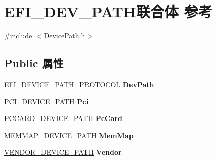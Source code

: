 \hypertarget{union_e_f_i___d_e_v___p_a_t_h}{}\section{E\+F\+I\+\_\+\+D\+E\+V\+\_\+\+P\+A\+T\+H联合体 参考}
\label{union_e_f_i___d_e_v___p_a_t_h}


{\ttfamily \#include $<$Device\+Path.\+h$>$}

\subsection*{Public 属性}
\begin{DoxyCompactItemize}
\item 
\mbox{\label{union_e_f_i___d_e_v___p_a_t_h_ac14a67fbd12394ef0799c15c72fb88a9}} 
\hyperlink{struct_e_f_i___d_e_v_i_c_e___p_a_t_h___p_r_o_t_o_c_o_l}{E\+F\+I\+\_\+\+D\+E\+V\+I\+C\+E\+\_\+\+P\+A\+T\+H\+\_\+\+P\+R\+O\+T\+O\+C\+OL} {\bfseries Dev\+Path}
\item 
\mbox{\label{union_e_f_i___d_e_v___p_a_t_h_a7fcfe4335f8ff1b4eee8801c46e94979}} 
\hyperlink{struct_p_c_i___d_e_v_i_c_e___p_a_t_h}{P\+C\+I\+\_\+\+D\+E\+V\+I\+C\+E\+\_\+\+P\+A\+TH} {\bfseries Pci}
\item 
\mbox{\label{union_e_f_i___d_e_v___p_a_t_h_ad92d805f8410a4fcf5afd60e151d579c}} 
\hyperlink{struct_p_c_c_a_r_d___d_e_v_i_c_e___p_a_t_h}{P\+C\+C\+A\+R\+D\+\_\+\+D\+E\+V\+I\+C\+E\+\_\+\+P\+A\+TH} {\bfseries Pc\+Card}
\item 
\mbox{\label{union_e_f_i___d_e_v___p_a_t_h_ae4615f296d569f70aaeafe26c6a7a728}} 
\hyperlink{struct_m_e_m_m_a_p___d_e_v_i_c_e___p_a_t_h}{M\+E\+M\+M\+A\+P\+\_\+\+D\+E\+V\+I\+C\+E\+\_\+\+P\+A\+TH} {\bfseries Mem\+Map}
\item 
\mbox{\label{union_e_f_i___d_e_v___p_a_t_h_ae87549e72caab07fb4a8084a341067e3}} 
\hyperlink{struct_v_e_n_d_o_r___d_e_v_i_c_e___p_a_t_h}{V\+E\+N\+D\+O\+R\+\_\+\+D\+E\+V\+I\+C\+E\+\_\+\+P\+A\+TH} {\bfseries Vendor}
\item 
\mbox{\label{union_e_f_i___d_e_v___p_a_t_h_a3086c68af78b397467d476cb9a064a1e}} 

\end{DoxyCompactItemize}
